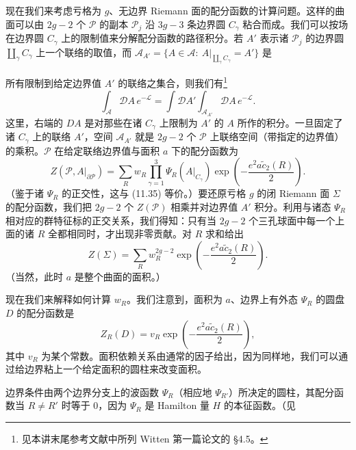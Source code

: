 现在我们来考虑亏格为 $g$、无边界 Riemann 面的配分函数的计算问题。这样的曲面可以由 $2g-2$ 个 $\mathcal{P}$ 的副本 $\mathcal{P}_j$ 沿 $3g-3$ 条边界圆 $C_\gamma$ 粘合而成。我们可以按场在边界圆 $C_\gamma$ 上的限制值来分解配分函数的路径积分。若 $A'$ 表示诸 $\mathcal{P}_j$ 的边界圆 $\coprod_\gamma C_\gamma$ 上一个联络的取值，而 $\mathcal{A}_{A'}=\{A\in\mathcal{A}:\ A|_{\coprod_\gamma C_\gamma}=A'\}$ 是

所有限制到给定边界值 $A'$ 的联络之集合，则我们有\footnote[3]{见本讲末尾参考文献中所列 Witten 第一篇论文的 §4.5。}
\begin{equation}
  \tag{11.36}
  \label{eq:11-36}
  \int_{\mathcal{A}}\mathcal{D}A\,e^{-\mathcal{L}}=\int \mathcal{D}A'\int_{\mathcal{A}_{A'}}\mathcal{D}A\,e^{-\mathcal{L}} .
\end{equation}
这里，右端的 $DA$ 是对那些在诸 $C_\gamma$ 上限制为 $A'$ 的 $A$ 所作的积分。一旦固定了诸 $C_\gamma$ 上的联络 $A'$，空间 $\mathcal{A}_{A'}$ 就是 $2g-2$ 个 $\mathcal{P}$ 上联络空间（带指定的边界值）的乘积。$\mathcal{P}$ 在给定联络边界值与面积 $a$ 下的配分函数为
\begin{equation}
  \tag{11.37}
  \label{eq:11-37}
  Z(\mathcal{P},A|_{\partial\mathcal{P}})=\sum_{R}w_R\prod_{\gamma=1}^{3}\Psi_R(A|_{C_\gamma})\exp\left(-\frac{e^{2}a\tilde{c}_2(R)}{2}\right).
\end{equation}
（鉴于诸 $\Psi_R$ 的正交性，这与 (11.35) 等价。）要还原亏格 $g$ 的闭 Riemann 面 $\Sigma$ 的配分函数，我们把 $2g-2$ 个 $Z(\mathcal{P})$ 相乘并对边界值 $A'$ 积分。利用与诸态 $\Psi_R$ 相对应的群特征标的正交关系，我们得知：只有当 $2g-2$ 个三孔球面中每一个上面的诸 $R$ 全都相同时，才出现非零贡献。对 $R$ 求和给出
\begin{equation}
  \tag{11.38}
  \label{eq:11-38}
  Z(\Sigma)=\sum_{R}w_R^{2g-2}\exp\left(-\frac{e^{2}a\tilde{c}_2(R)}{2}\right).
\end{equation}
（当然，此时 $a$ 是整个曲面的面积。）

现在我们来解释如何计算 $w_R$。我们注意到，面积为 $a$、边界上有外态 $\Psi_R$ 的圆盘 $D$ 的配分函数是
\begin{equation}
  \tag{11.39}
  \label{eq:11-39}
  Z_R(D)=v_R\exp\left(-\frac{e^{2}a\tilde{c}_2(R)}{2}\right),
\end{equation}
其中 $v_R$ 为某个常数。面积依赖关系由通常的因子给出，因为同样地，我们可以通过给边界粘上一个给定面积的圆柱来改变面积。

边界条件由两个边界分支上的波函数 $\Psi_R$（相应地 $\Psi_{R'}$）所决定的圆柱，其配分函数当 $R\neq R'$ 时等于 $0$，因为 $\Psi_R$ 是 Hamilton 量 $H$ 的本征函数。（见

